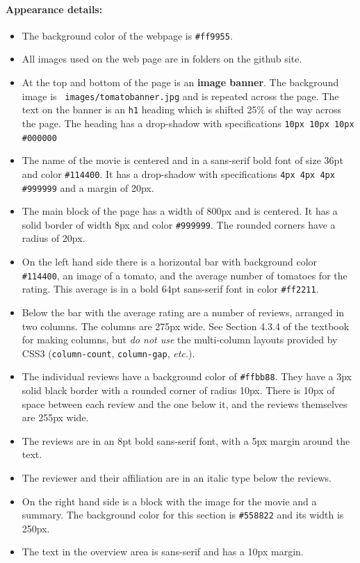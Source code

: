 \documentclass{article}
\begin{document}
\paragraph{Appearance details:}
\begin{itemize}
\item The background color of the webpage is \verb|#ff9955|.
  \item
All images used on the web page are in folders on the github site.
\item
At the top and bottom of the page is an {\bf image banner}.
 The background image is {\tt
   images/tomatobanner.jpg} and is repeated across the page.
 The text
on the banner is an {\tt h1} heading which is shifted 25\% of the way
across the page.  The heading has a drop-shadow with specifications
\verb|10px 10px 10px #000000|
\item
The name of the movie is centered and in a sans-serif bold font
of size 36pt and color \verb|#114400|.  It has a drop-shadow with
specifications \verb|4px 4px 4px #999999| and a margin of 20px.
\item
The main block of the page has a width of 800px and is centered.
It has a solid border of width 8px and color \verb|#999999|.  The
rounded corners have a radius of 20px.  
\item
On the left hand side there is a horizontal bar with background color
\verb|#114400|, an image of a tomato, and the average number of
tomatoes for the rating.  This average is in a bold 64pt sans-serif
font in color \verb|#ff2211|.
\item
Below the bar with the average rating are a number of reviews,
arranged in two columns.
The columns are 275px wide. See Section 4.3.4 of the textbook for making
columns, but {\em do not use} the multi-column layouts provided by
CSS3 ({\tt column-count}, {\tt column-gap}, {\em etc.}).  
\item
The individual reviews have a background color of \verb|#ffbb88|.
They have a 3px solid black border with a rounded corner of radius
10px. There is 10px of space between each review and the one below it,
and the reviews themselves are 255px wide.
\item
The reviews are in an 8pt bold sans-serif font, with a 5px margin
around the text.
\item
The reviewer and their affiliation are in an italic type below the
reviews. 
\item
On the right hand side is a block with the image for the movie and a
summary.  The background color for this section is \verb|#558822| and
its width is 250px.
\item
The text in the overview area is sans-serif and has a 10px margin.
\end{itemize}
\end{document}
